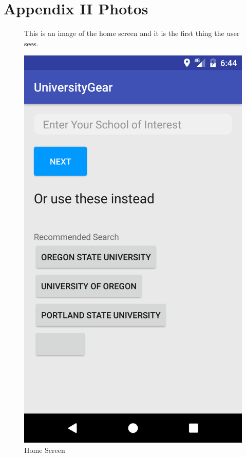 \documentclass[journal,compsoc, 10pt, draftclsnofoot, onecolumn]{IEEEtran}
\begin{document}
\section{Appendix II Photos}

\begin{figure}[!h]
This is an image of the home screen and it is the first thing the user sees. 
\centering
\caption{Home Screen}
\includegraphics[scale=.11]{homeScreen}
\end{figure}
\FloatBarrier
\end{document}
